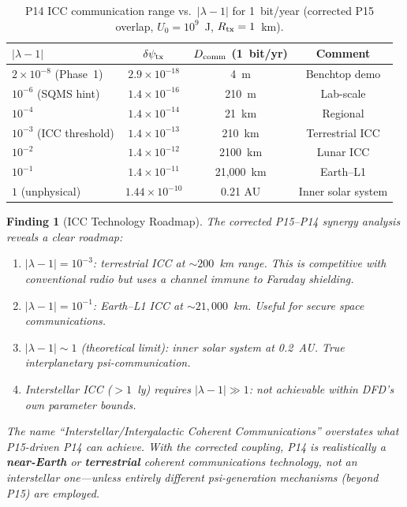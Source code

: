 \documentclass[11pt]{article}
\newtheorem{finding}{Finding}
\newcommand{\ee}[1]{\times 10^{#1}}
\begin{document}
\begin{table}[h]
\centering
\caption{P14 ICC communication range vs.\ $|\lambda-1|$ for 1~bit/year
(corrected P15 overlap, $U_0 = 10^9$~J, $R_{\rm tx} = 1$~km).}
\begin{tabular}{lccc}
\toprule
$|\lambda-1|$ & $\delta\psi_{\rm tx}$ & $D_{\rm comm}$ (1~bit/yr) & Comment \\
\midrule
$2\ee{-8}$ (Phase~1) & $2.9\ee{-18}$ & 4~m & Benchtop demo \\
$10^{-6}$ (SQMS hint) & $1.4\ee{-16}$ & 210~m & Lab-scale \\
$10^{-4}$ & $1.4\ee{-14}$ & 21~km & Regional \\
$10^{-3}$ (ICC threshold) & $1.4\ee{-13}$ & 210~km & Terrestrial ICC \\
$10^{-2}$ & $1.4\ee{-12}$ & 2100~km & Lunar ICC \\
$10^{-1}$ & $1.4\ee{-11}$ & 21,000~km & Earth--L1 \\
$1$ (unphysical) & $1.44\ee{-10}$ & 0.21 AU & Inner solar system \\
\bottomrule
\end{tabular}
\end{table}

\begin{finding}[ICC Technology Roadmap]
The corrected P15--P14 synergy analysis reveals a clear roadmap:
\begin{enumerate}
\item $|\lambda-1| = 10^{-3}$: terrestrial ICC at $\sim 200$~km range.
  This is competitive with conventional radio but uses a channel
  immune to Faraday shielding.
\item $|\lambda-1| = 10^{-1}$: Earth--L1 ICC at $\sim 21,000$~km.
  Useful for secure space communications.
\item $|\lambda-1| \sim 1$ (theoretical limit): inner solar system
  at 0.2~AU. True interplanetary psi-communication.
\item Interstellar ICC ($> 1$~ly) requires $|\lambda-1| \gg 1$:
  \textit{not achievable within DFD's own parameter bounds}.
\end{enumerate}

The name ``Interstellar/Intergalactic Coherent Communications''
overstates what P15-driven P14 can achieve. With the corrected
coupling, P14 is realistically a \textbf{near-Earth} or
\textbf{terrestrial} coherent communications technology, not an
interstellar one---unless entirely different psi-generation
mechanisms (beyond P15) are employed.
\end{finding}
\end{document}
